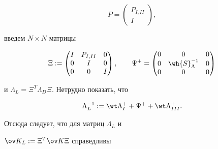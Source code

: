 \begin{equation}


P=


\begin{pmatrix}


P_{I,II}\\


I


\end{pmatrix}


,


\end{equation}


введем $N \times N$ матрицы


\begin{equation}


\Xi:=


\begin{pmatrix}


I&P_{I,II} &0 \\


0& I& 0 \\


0& 0 & I


\end{pmatrix}


,\qquad


\Psi^{+}=


\begin{pmatrix}


0& 0 &0 \\


0& \wh{S}_{\Lambda}^{-1}& 0 \\


0& 0 & 0


\end{pmatrix}


\label{7.17}


\end{equation}


и $\Lambda_L=\Xi^T \Lambda_D \Xi$. Нетрудно показать, что 


\begin{equation}


\Lambda^{-1}_L:=\wt \Lambda^{+}_I+\Psi^++


\wt \Lambda^+_{III}.


\label{7.18}


\end{equation}


Отсюда следует, что для матриц $\Lambda_L$ и 


$\ov K_L:=\Xi^T \ov K \Xi$ справедливы 


